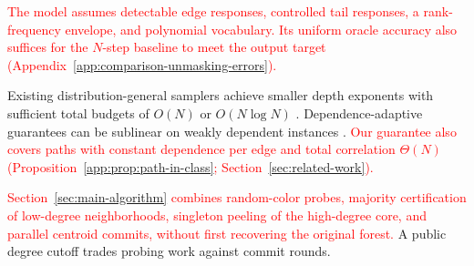 \documentclass{article} %
\newif\ifincludeexponents
\begin{document}
\textcolor{red}{The model assumes detectable edge responses, controlled tail responses,
a rank-frequency envelope, and polynomial vocabulary.
Its uniform oracle accuracy also suffices
for the $N$-step baseline to meet the output target
(Appendix~\ref{app:comparison-unmasking-errors}).}

Existing distribution-general samplers achieve smaller depth exponents
with sufficient total budgets of $O(N)$ or $O(N\log N)$
\citep{anari2024parallel,anari2026autospeculation}.
Dependence-adaptive guarantees can be sublinear on weakly dependent
instances \citep{li2025convergence,zhao2026adaptation}.
\textcolor{red}{Our guarantee also covers paths with constant dependence per
edge and total correlation $\Theta(N)$
(Proposition~\ref{app:prop:path-in-class}; Section~\ref{sec:related-work}).}

\textcolor{red}{Section~\ref{sec:main-algorithm} combines random-color probes,
majority certification of low-degree neighborhoods, singleton peeling of the
high-degree core, and parallel centroid commits, without first recovering
the original forest.}
A public degree cutoff trades probing work against commit rounds.









\label{proposal:main-text-end}
\clearpage
\ifdefined\ArxivVersion
  
\fi

\ifdefined\ArxivVersion
  
\fi


\ifdefined\ArxivVersion
  
\else
  
\fi

\appendix








\ifincludeexponents

\fi



\end{document}
